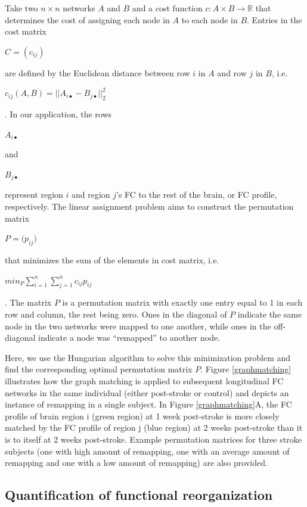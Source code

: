 \documentclass[phd,tocprelim]{cornell}
\begin{document}
	Take two $n \times n $ networks $A$ and $B$ and a cost function $c: A \times B \rightarrow  \mathbb{R}$  that determines the cost of assigning each node in $A$ to each node in $B$. Entries in the cost matrix 
	\begin{Large}
	$C = (c_{i j})$
	\end{Large}
	 are defined by the Euclidean distance between row $i$ in $A$ and row $j$ in $B$, i.e. \begin{Large}$c_{ij}(A,B)=|| A_{i\bullet}-B_{j \bullet} ||^2_2$\end{Large}. In our application, the rows \begin{Large}$A_{i\bullet}$\end{Large} and \begin{Large}$B_{j \bullet}$\end{Large} represent region $i$ and region $j$'s FC to the rest of the brain, or FC profile, respectively. The linear assignment problem aims to construct the permutation matrix \begin{Large}$P = \big(p_{i j}\big)$\end{Large} that minimizes the sum of the elements in cost matrix, i.e. \begin{Large}$min_P\sum^n_{i=1}\sum^n_{j=1}c_{ij}p_{ij}$\end{Large} . The matrix $P$ is a permutation matrix with exactly one entry equal to 1 in each row and column, the rest being zero. Ones in the diagonal of $P$ indicate the same node in the two networks were mapped to one another, while ones in the off-diagonal indicate a node was “remapped” to another node.
	
	Here, we use the Hungarian algorithm to solve this minimization problem and find the corresponding optimal permutation matrix $P$. Figure \ref{graphmatching} illustrates how the graph matching is applied to subsequent longitudinal FC networks in the same individual (either post-stroke or control) and depicts an instance of remapping in a single subject.  In Figure \ref{graphmatching}A, the FC profile of brain region i (green region) at 1 week post-stroke is more closely matched by the FC profile of region j (blue region) at 2 weeks post-stroke than it is to itself at 2 weeks post-stroke. Example permutation matrices for three stroke subjects (one with high amount of remapping, one with an average amount of remapping and one with a low amount of remapping) are also provided. 
	
	\subsection{Quantification of functional reorganization}
	
\end{document}
